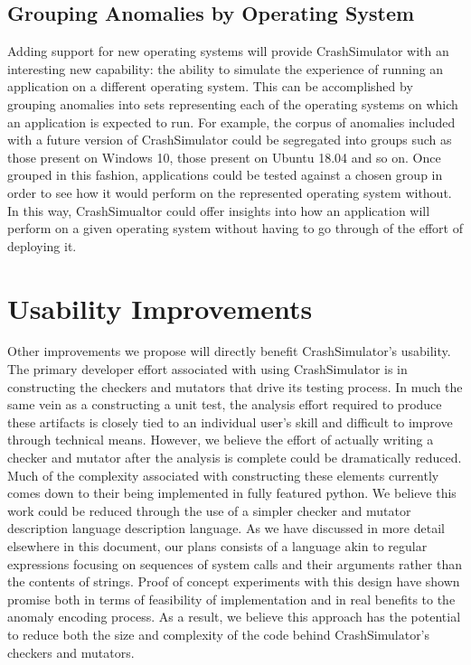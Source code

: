 \documentclass[twocolumn]{article}
\begin{document}
\subsection{Grouping Anomalies by Operating System}

Adding support for new operating systems will provide CrashSimulator with
an interesting new capability: the ability to simulate the experience of
running an application on a different operating system.  This can be
accomplished by grouping anomalies into sets representing each of the
operating systems on which an application is expected to run. For example,
the corpus of anomalies included with a future version of CrashSimulator
could be segregated into groups such as those present on Windows 10, those
present on Ubuntu 18.04 and so on.  Once grouped in this fashion,
applications could be tested against a chosen group in order to see how it
would perform on the represented operating system without. In this way,
CrashSimualtor could offer insights into how an application will perform on
a given operating system without having to go through of the effort of
deploying it.


\section{Usability Improvements}

Other improvements we propose will directly benefit CrashSimulator's
usability.  The primary developer effort associated with using
CrashSimulator is in constructing the checkers and mutators that drive its
testing process.  In much the same vein as a constructing a unit test, the
analysis effort required to produce these artifacts is closely tied to an
individual user's skill and difficult to improve through technical means.
However, we believe the effort of actually writing a checker and mutator
after the analysis is complete could be dramatically reduced.  Much of the
complexity associated with constructing these elements currently comes down
to their being implemented in fully featured python.  We believe this work
could be reduced through the use of a simpler checker and mutator
description language description language.  As we have discussed in more
detail elsewhere in this document, our plans consists of a language akin to
regular expressions focusing on sequences of system calls and their
arguments rather than the contents of strings.  Proof of concept
experiments with this design have shown promise both in terms of
feasibility of implementation and in real benefits to the anomaly encoding
process.  As a result, we believe this approach has the potential to reduce
both the size and complexity of the code behind CrashSimulator's checkers
and mutators.
\end{document}
